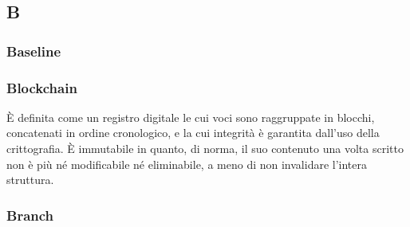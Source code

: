 \subsection*{\textbf{\hfill \Huge{B} \hfill}} 
\subsubsection*{Baseline}

\subsubsection*{Blockchain}
È definita come un registro digitale le cui voci sono raggruppate in blocchi, concatenati in ordine cronologico, e la cui integrità è garantita dall’uso della crittografia. È immutabile in quanto, di norma, il suo contenuto una volta scritto non è più né modificabile né eliminabile, a meno di non invalidare l’intera struttura.
\subsubsection*{Branch}

